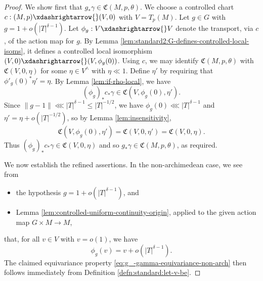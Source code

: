 \begin{proof}
  We show first that $g_* \gamma \in \mathfrak{C}(M,p,\theta)$.  We choose a controlled chart $c : (M,p) \xdashrightarrow{} (V,0)$ with $V = T_p(M)$.  Let $g \in G$ with $g = 1 + o(|T|^{\delta-1})$.  Let $\phi_g : V \xdashrightarrow{} V$ denote the transport, via $c$, of the action map for $g$.  By Lemma \ref{lem:standard2:G-defines-controlled-local-isoms}, it defines a controlled local isomorphism $(V,0) \xdashrightarrow{} (V, \phi_g(0))$.  Using $c$, we may identify $\mathfrak{C}(M,p,\theta)$ with $\mathfrak{C}(V,0,\eta)$ for some $\eta \in V^\wedge$ with $\eta \ll 1$.  Define $\eta '$ by requiring that $\phi '_g(0)^* \eta ' = \eta$.  By Lemma \ref{lem:if-rho-local}, we have
  \begin{equation*}
    (\phi_g)_* c_* \gamma \in \mathfrak{C}(V, \phi_g(0), \eta ').
  \end{equation*}
  Since $\|g - 1\| \lll |T|^{\delta-1} \leq |T|^{-1/2}$, we have $\phi_g(0) \lll |T|^{\delta-1}$ and  $\eta ' = \eta + o(|T|^{-1/2})$, so by Lemma \ref{lem:insensitivity},
  \begin{equation*}
    \mathfrak{C}(V, \phi_g(0), \eta ')
    =
    \mathfrak{C}(V,0,\eta ') = \mathfrak{C}(V,0,\eta).
  \end{equation*}
  Thus $(\phi_g)_* c_* \gamma  \in \mathfrak{C}(V,0,\eta)$ and so $g_* \gamma \in \mathfrak{C}(M,p,\theta)$, as required.

  We now establish the refined assertions.  In the non-archimedean case, we see from
  \begin{itemize}
  \item the hypothesis $g = 1 + o(|T|^{\delta-1})$,  and
  \item Lemma \ref{lem:controlled-uniform-continuity-origin}, applied to the given action map $G \times M \rightarrow  M$,
  \end{itemize}
  that, for all $v \in V$ with $v = o(1)$, we have
  \begin{equation*}
    \phi_g(v) = v + o(|T|^{\delta-1}).
  \end{equation*}
  The claimed equivariance property \eqref{eq:g_-gamma-equivariance-non-arch} then follows immediately from Definition \ref{defn:standard:let-v-be}.


\end{proof}
